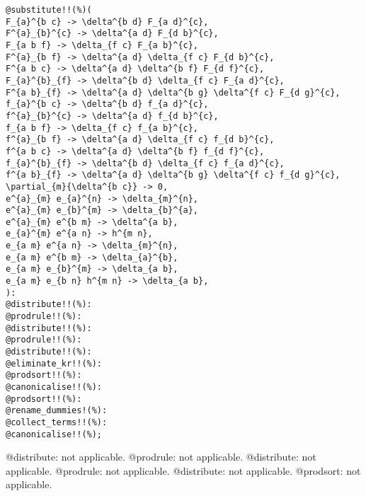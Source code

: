 \documentclass[11pt]{article}
\begin{document}
{\color[named]{Blue}\begin{verbatim}
@substitute!!(%)(
F_{a}^{b c} -> \delta^{b d} F_{a d}^{c},
F^{a}_{b}^{c} -> \delta^{a d} F_{d b}^{c},
F_{a b f} -> \delta_{f c} F_{a b}^{c},
F^{a}_{b f} -> \delta^{a d} \delta_{f c} F_{d b}^{c},
F^{a b c} -> \delta^{a d} \delta^{b f} F_{d f}^{c},
F_{a}^{b}_{f} -> \delta^{b d} \delta_{f c} F_{a d}^{c},
F^{a b}_{f} -> \delta^{a d} \delta^{b g} \delta^{f c} F_{d g}^{c},
f_{a}^{b c} -> \delta^{b d} f_{a d}^{c},
f^{a}_{b}^{c} -> \delta^{a d} f_{d b}^{c},
f_{a b f} -> \delta_{f c} f_{a b}^{c},
f^{a}_{b f} -> \delta^{a d} \delta_{f c} f_{d b}^{c},
f^{a b c} -> \delta^{a d} \delta^{b f} f_{d f}^{c},
f_{a}^{b}_{f} -> \delta^{b d} \delta_{f c} f_{a d}^{c},
f^{a b}_{f} -> \delta^{a d} \delta^{b g} \delta^{f c} f_{d g}^{c},
\partial_{m}{\delta^{b c}} -> 0,
e^{a}_{m} e_{a}^{n} -> \delta_{m}^{n},
e^{a}_{m} e_{b}^{m} -> \delta_{b}^{a},
e^{a}_{m} e^{b m} -> \delta^{a b},
e_{a}^{m} e^{a n} -> h^{m n},
e_{a m} e^{a n} -> \delta_{m}^{n},
e_{a m} e^{b m} -> \delta_{a}^{b},
e_{a m} e_{b}^{m} -> \delta_{a b},
e_{a m} e_{b n} h^{m n} -> \delta_{a b},
):
@distribute!!(%):
@prodrule!!(%):
@distribute!!(%):
@prodrule!!(%):
@distribute!!(%):
@eliminate_kr!!(%):
@prodsort!!(%):
@canonicalise!!(%):
@prodsort!!(%):
@rename_dummies!(%):
@collect_terms!!(%):
@canonicalise!!(%);
\end{verbatim}}
@distribute: not applicable.
@prodrule: not applicable.
@distribute: not applicable.
@prodrule: not applicable.
@distribute: not applicable.
@prodsort: not applicable.
\end{document}
